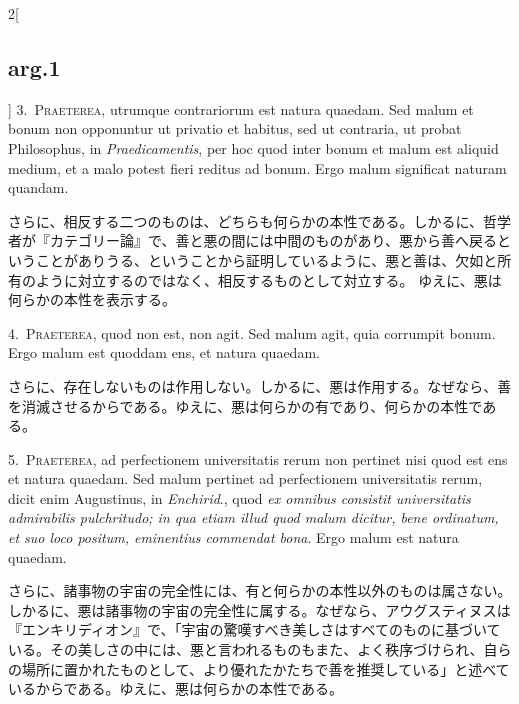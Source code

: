 \documentclass[paper=a4paper,fontsize=10pt,jafontsize=9pt,titlepage]{jlreq}
\begin{document}
\begin{paracol}{2}[\subsection{arg.1}]
3.~{\scshape Praeterea}, utrumque contrariorum est natura quaedam. Sed
malum et bonum non opponuntur ut privatio et habitus, sed ut contraria,
ut probat Philosophus, in {\itshape Praedicamentis}, per hoc quod inter
bonum et malum est aliquid medium, et a malo potest fieri reditus ad
bonum. Ergo malum significat naturam quandam.

\switchcolumn

さらに、相反する二つのものは、どちらも何らかの本性である。しかるに、哲学
者が『カテゴリー論』で、善と悪の間には中間のものがあり、悪から善へ戻ると
いうことがありうる、ということから証明しているように、悪と善は、欠如と所
有のように対立するのではなく、相反するものとして対立する。
ゆえに、悪は何らかの本性を表示する。


4.~{\scshape Praeterea}, quod non est, non agit. Sed malum agit, quia
corrumpit bonum. Ergo malum est quoddam ens, et natura quaedam.

\switchcolumn

さらに、存在しないものは作用しない。しかるに、悪は作用する。なぜなら、善
を消滅させるからである。ゆえに、悪は何らかの有であり、何らかの本性である。


5.~{\scshape Praeterea}, ad perfectionem universitatis rerum non
pertinet nisi quod est ens et natura quaedam. Sed malum pertinet ad
perfectionem universitatis rerum, dicit enim Augustinus, in {\itshape Enchirid}.,
quod {\itshape ex omnibus consistit universitatis admirabilis pulchritudo; in qua
etiam illud quod malum dicitur, bene ordinatum, et suo loco positum,
eminentius commendat bona}. Ergo malum est natura quaedam.

\switchcolumn

さらに、諸事物の宇宙の完全性には、有と何らかの本性以外のものは属さない。しかるに、悪は諸事物の宇宙の完全性に属する。なぜなら、アウグスティヌスは『エンキリディオン』で、「宇宙の驚嘆すべき美しさはすべてのものに基づいている。その美しさの中には、悪と言われるものもまた、よく秩序づけられ、自らの場所に置かれたものとして、より優れたかたちで善を推奨している」と述べているからである。ゆえに、悪は何らかの本性である。


\end{paracol}
\end{document}
